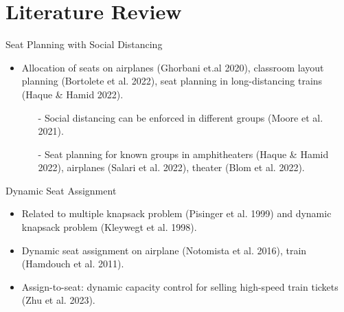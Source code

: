 
\section{Literature Review}
    \frame{\sectionpage}
    \begin{frame}{Seat Planning with Social Distancing}
      \begin{itemize}
        \item Allocation of seats on {\color{green} airplanes} (Ghorbani et.al 2020), {\color{green} classroom} layout planning (Bortolete et al. 2022), seat planning in long-distancing {\color{green} trains} (Haque \& Hamid 2022).
        \vspace*{0.5cm}

        \begin{itemize}
        \item[-] Social distancing can be enforced in different {\color{red}groups} (Moore et al. 2021).
        \vspace*{0.5cm}

        \item[-] Seat planning for known {\color{red}groups} in amphitheaters (Haque \& Hamid 2022), airplanes (Salari et al. 2022), {\color{green} theater} (Blom et al. 2022).   
        \end{itemize}
        
      \end{itemize}
      \end{frame}
      
      \begin{frame}{Dynamic Seat Assignment}
        \begin{itemize}
          \item Related to multiple knapsack problem (Pisinger et al. 1999) and dynamic knapsack problem (Kleywegt et al. 1998).
          \vspace*{0.5cm}
          \item Dynamic seat assignment on airplane (Notomista et al. 2016), train (Hamdouch et al. 2011).
          \vspace*{0.5cm}
          \item {\color{red} Assign-to-seat}: dynamic capacity control for selling high-speed train
          tickets (Zhu et al. 2023). 
        \end{itemize}

      \end{frame}